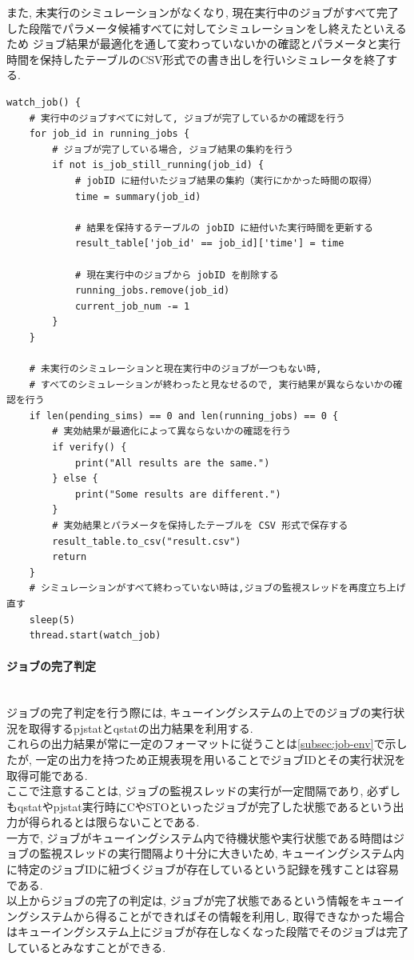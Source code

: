 また, 未実行のシミュレーションがなくなり, 現在実行中のジョブがすべて完了した段階でパラメータ候補すべてに対してシミュレーションをし終えたといえるため
ジョブ結果が最適化を通して変わっていないかの確認とパラメータと実行時間を保持したテーブルのCSV形式での書き出しを行いシミュレータを終了する.\\
{\footnotesize
\begin{lstlisting}[caption=ジョブ実行の監視と後処理　疑似コード, frame=single]
watch_job() {
    # 実行中のジョブすべてに対して, ジョブが完了しているかの確認を行う
    for job_id in running_jobs {
        # ジョブが完了している場合, ジョブ結果の集約を行う
        if not is_job_still_running(job_id) {
            # jobID に紐付いたジョブ結果の集約（実行にかかった時間の取得）
            time = summary(job_id)

            # 結果を保持するテーブルの jobID に紐付いた実行時間を更新する
            result_table['job_id' == job_id]['time'] = time

            # 現在実行中のジョブから jobID を削除する
            running_jobs.remove(job_id)
            current_job_num -= 1
        }
    }

    # 未実行のシミュレーションと現在実行中のジョブが一つもない時,
    # すべてのシミュレーションが終わったと見なせるので, 実行結果が異ならないかの確認を行う
    if len(pending_sims) == 0 and len(running_jobs) == 0 {
        # 実効結果が最適化によって異ならないかの確認を行う
        if verify() {
            print("All results are the same.")
        } else {
            print("Some results are different.")
        }
        # 実効結果とパラメータを保持したテーブルを CSV 形式で保存する
        result_table.to_csv("result.csv")
        return
    }
    # シミュレーションがすべて終わっていない時は,ジョブの監視スレッドを再度立ち上げ直す
    sleep(5)
    thread.start(watch_job)
\end{lstlisting}
}

\paragraph{ジョブの完了判定}~\\
ジョブの完了判定を行う際には, キューイングシステムの上でのジョブの実行状況を取得するpjstatとqstatの出力結果を利用する.\\
これらの出力結果が常に一定のフォーマットに従うことは\ref{subsec:job-env}で示したが, 一定の出力を持つため正規表現を用いることでジョブIDとその実行状況を取得可能である.\\
ここで注意することは, ジョブの監視スレッドの実行が一定間隔であり,
必ずしもqstatやpjstat実行時にCやSTOといったジョブが完了した状態であるという出力が得られるとは限らないことである.\\
一方で, ジョブがキューイングシステム内で待機状態や実行状態である時間はジョブの監視スレッドの実行間隔より十分に大きいため,
キューイングシステム内に特定のジョブIDに紐づくジョブが存在しているという記録を残すことは容易である.\\
以上からジョブの完了の判定は, ジョブが完了状態であるという情報をキューイングシステムから得ることができればその情報を利用し,
取得できなかった場合はキューイングシステム上にジョブが存在しなくなった段階でそのジョブは完了しているとみなすことができる.\\

